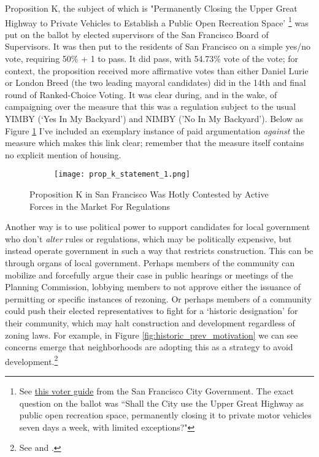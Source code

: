 \documentclass{article}
\begin{document}
Proposition K, the subject of which is "Permanently Closing the Upper Great Highway to Private Vehicles to Establish a Public Open Recreation Space' \footnote{See \href{https://voterguide.sfelections.org/local-ballot-measures/proposition-k}{this voter guide} from the San Francisco City Government. The exact question on the ballot was ``Shall the City use the Upper Great Highway as public open recreation space, permanently closing it to private motor vehicles seven days a week, with limited exceptions?"} was put on the ballot by elected supervisors of the San Francisco Board of Supervisors. It was then put to the residents of San Francisco on a simple yes/no vote, requiring 50\% + 1 to pass. It did pass, with 54.73\% vote of the vote; for context, the proposition received more affirmative votes than either Daniel Lurie or London Breed (the two leading mayoral candidates) did in the 14th and final round of Ranked-Choice Voting. It was clear during, and in the wake, of campaigning over the measure that this was a regulation subject to the usual YIMBY (`Yes In My Backyard') and NIMBY ('No In My Backyard'). Below as Figure \ref{fig:prop_k_motivation} I've included an exemplary instance of paid argumentation \textit{against} the measure which makes this link clear; remember that the measure itself contains no explicit mention of housing.

\begin{figure}[hbt]
\centering
\begin{subfigure}[b]{0.8\textwidth}
	\centering
	\texttt{[image: prop\_k\_statement\_1.png]}
\end{subfigure}
\caption{Proposition K in San Francisco Was Hotly Contested by Active Forces in the Market For Regulations}
\label{fig:prop_k_motivation}
\end{figure}

Another way is to use political power to support candidates for local government who don't \textit{alter}  rules or regulations, which may be politically expensive, but instead operate government in such a way that restricts construction. This can be through organs of local government. Perhaps members of the community can mobilize and forcefully argue their case in public hearings or meetings of the Planning Commission, lobbying members to not approve either the issuance of permitting or specific instances of rezoning. Or perhaps members of a community could push their elected representatives to fight for a `historic designation' for their community, which may halt construction and development regardless of zoning laws. For example, in Figure \ref{fig:historic_prev_motivation} we can see concerns emerge that neighborhoods are adopting this as a strategy to avoid development.\footnote{See \parencite{Li2025} and \parencite{Appelbaum2023}.}
\end{document}

